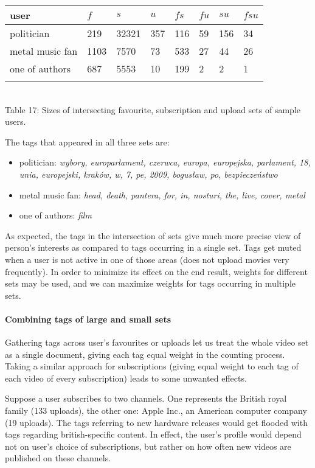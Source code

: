 \begin{center}
\begin{tabular}{| l | l | l | l | l | l | l | l |}
user & $f$ & $s$ & $u$ & $fs$ & $fu$ & $su$ & $fsu$ \\ \hline
politician & 219 & 32321 & 357 & 116 & 59 & 156 & 34 \\
metal music fan & 1103 & 7570 & 73 & 533 & 27 & 44 & 26 \\
one of authors & 687 & 5553 & 10 & 199 & 2 & 2 & 1 \\
\label{intersections}
\end{tabular} \\
Table 17: Sizes of intersecting favourite, subscription and upload sets of sample users. \\
\end{center}

The tags that appeared in all three sets are:
\begin{itemize}
  \item{politician: \emph{wybory, europarlament, czerwca, europa, europejska,
  parlament, 18, unia, europejski, kraków, w, 7, pe, 2009, bogusław, po,
  bezpieczeństwo}}
  \item{metal music fan: \emph{head, death, pantera, for, in, nosturi, the, live, cover, metal}}
  \item{one of authors: \emph{film}}
\end{itemize}

As expected, the tags in the intersection of sets give much more precise view of person's
interests as compared to tags occurring in a single set. Tags get muted when a user is not active in one of
those areas (\eg does not upload movies very frequently). In order to minimize its effect on the
end result, weights for different sets may be used, and we can maximize weights for tags occurring
in multiple sets.

\paragraph{Combining tags of large and small sets}
Gathering tags across user's favourites or uploads let us treat the whole video
set as a single document, giving each tag equal weight in the counting process.
Taking a similar approach for subscriptions (\eg giving equal weight to each
tag of each video of every subscription) leads to some unwanted effects.

Suppose a user subscribes to two channels. One represents the British royal
family (133 uploads), the other one: Apple Inc., an American computer company
(19 uploads). The tags referring to new hardware releases would get flooded with
tags regarding british-specific content. In effect, the user's profile would
depend not on user's choice of subscriptions, but rather on how often new videos
are published on these channels.

